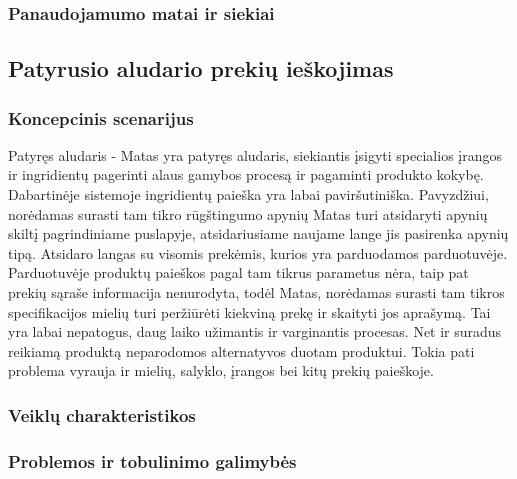 \documentclass[oneside]{VUMIFPSkursinis}
\begin{document}
		\subsubsection{Panaudojamumo matai ir siekiai}
	\subsection{Patyrusio aludario prekių ieškojimas}
		\subsubsection{Koncepcinis scenarijus}
			Patyręs aludaris - Matas yra patyręs aludaris, siekiantis įsigyti specialios įrangos ir ingridientų pagerinti alaus gamybos procesą ir pagaminti produkto kokybę.
			Dabartinėje sistemoje ingridientų paieška yra labai paviršutiniška.
			Pavyzdžiui, norėdamas surasti tam tikro rūgštingumo apynių Matas turi atsidaryti apynių skiltį pagrindiniame puslapyje, atsidariusiame naujame lange jis pasirenka apynių tipą.
			Atsidaro langas su visomis prekėmis, kurios yra parduodamos parduotuvėje.
			Parduotuvėje produktų paieškos pagal tam tikrus parametus nėra, taip pat prekių sąraše informacija nenurodyta, todėl Matas, norėdamas surasti tam tikros specifikacijos mielių turi peržiūrėti kiekviną prekę ir skaityti jos aprašymą.
			Tai yra labai nepatogus, daug laiko užimantis ir varginantis procesas.
			Net ir suradus reikiamą produktą neparodomos alternatyvos duotam produktui.
			Tokia pati problema vyrauja ir mielių, salyklo, įrangos bei kitų prekių paieškoje.
		\subsubsection{Veiklų charakteristikos}
		\subsubsection{Problemos ir tobulinimo galimybės}
\end{document}
